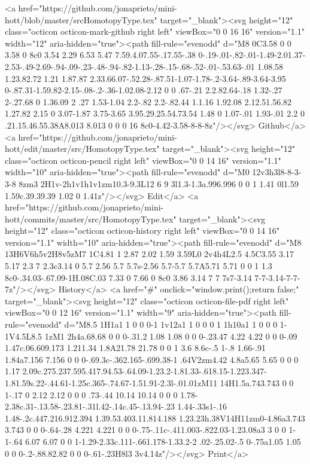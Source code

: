       <a href="https://github.com/jonaprieto/mini-hott/blob/master/srcHomotopyType.tex" target="_blank"><svg height="12" class="octicon octicon-mark-github right left" viewBox="0 0 16 16" version="1.1" width="12" aria-hidden="true"><path fill-rule="evenodd" d="M8 0C3.58 0 0 3.58 0 8c0 3.54 2.29 6.53 5.47 7.59.4.07.55-.17.55-.38 0-.19-.01-.82-.01-1.49-2.01.37-2.53-.49-2.69-.94-.09-.23-.48-.94-.82-1.13-.28-.15-.68-.52-.01-.53.63-.01 1.08.58 1.23.82.72 1.21 1.87.87 2.33.66.07-.52.28-.87.51-1.07-1.78-.2-3.64-.89-3.64-3.95 0-.87.31-1.59.82-2.15-.08-.2-.36-1.02.08-2.12 0 0 .67-.21 2.2.82.64-.18 1.32-.27 2-.27.68 0 1.36.09 2 .27 1.53-1.04 2.2-.82 2.2-.82.44 1.1.16 1.92.08 2.12.51.56.82 1.27.82 2.15 0 3.07-1.87 3.75-3.65 3.95.29.25.54.73.54 1.48 0 1.07-.01 1.93-.01 2.2 0 .21.15.46.55.38A8.013 8.013 0 0 0 16 8c0-4.42-3.58-8-8-8z"/></svg> Github</a>
      <a href="https://github.com/jonaprieto/mini-hott/edit/master/src/HomotopyType.tex" target="_blank"><svg height="12" class="octicon octicon-pencil right left" viewBox="0 0 14 16" version="1.1" width="10" aria-hidden="true"><path fill-rule="evenodd" d="M0 12v3h3l8-8-3-3-8 8zm3 2H1v-2h1v1h1v1zm10.3-9.3L12 6 9 3l1.3-1.3a.996.996 0 0 1 1.41 0l1.59 1.59c.39.39.39 1.02 0 1.41z"/></svg> Edit</a>
      <a href="https://github.com/jonaprieto/mini-hott/commits/master/src/HomotopyType.tex" target="_blank"><svg height="12" class="octicon octicon-history right left" viewBox="0 0 14 16" version="1.1" width="10" aria-hidden="true"><path fill-rule="evenodd" d="M8 13H6V6h5v2H8v5zM7 1C4.81 1 2.87 2.02 1.59 3.59L0 2v4h4L2.5 4.5C3.55 3.17 5.17 2.3 7 2.3c3.14 0 5.7 2.56 5.7 5.7s-2.56 5.7-5.7 5.7A5.71 5.71 0 0 1 1.3 8c0-.34.03-.67.09-1H.08C.03 7.33 0 7.66 0 8c0 3.86 3.14 7 7 7s7-3.14 7-7-3.14-7-7-7z"/></svg> History</a>
      <a  href="#" onclick="window.print();return false;" target="_blank"><svg height="12" class="octicon octicon-file-pdf right left" viewBox="0 0 12 16" version="1.1" width="9" aria-hidden="true"><path fill-rule="evenodd" d="M8.5 1H1a1 1 0 0 0-1 1v12a1 1 0 0 0 1 1h10a1 1 0 0 0 1-1V4.5L8.5 1zM1 2h4a.68.68 0 0 0-.31.2 1.08 1.08 0 0 0-.23.47 4.22 4.22 0 0 0-.09 1.47c.06.609.173 1.211.34 1.8A21.78 21.78 0 0 1 3.6 8.6c-.5 1-.8 1.66-.91 1.84a7.156 7.156 0 0 0-.69.3c-.362.165-.699.38-1 .64V2zm4.42 4.8a5.65 5.65 0 0 0 1.17 2.09c.275.237.595.417.94.53-.64.09-1.23.2-1.81.33-.618.15-1.223.347-1.81.59s.22-.44.61-1.25c.365-.74.67-1.51.91-2.3l-.01.01zM11 14H1.5a.743.743 0 0 1-.17 0 2.12 2.12 0 0 0 .73-.44 10.14 10.14 0 0 0 1.78-2.38c.31-.13.58-.23.81-.31l.42-.14c.45-.13.94-.23 1.44-.33s1-.16 1.48-.2c.447.216.912.394 1.39.53.403.11.814.188 1.23.23h.38V14H11zm0-4.86a3.743 3.743 0 0 0-.64-.28 4.221 4.221 0 0 0-.75-.11c-.411.003-.822.03-1.23.08a3 3 0 0 1-1-.64 6.07 6.07 0 0 1-1.29-2.33c.111-.661.178-1.33.2-2 .02-.25.02-.5 0-.75a1.05 1.05 0 0 0-.2-.88.82.82 0 0 0-.61-.23H8l3 3v4.14z"/></svg> Print</a>
